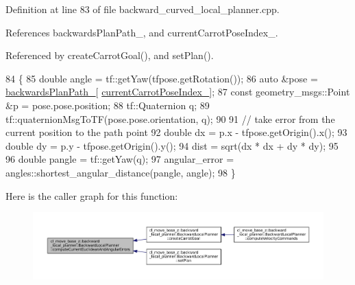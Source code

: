 Definition at line 83 of file backward\+\_\+curved\+\_\+local\+\_\+planner.\+cpp.



References backwards\+Plan\+Path\+\_\+, and current\+Carrot\+Pose\+Index\+\_\+.



Referenced by create\+Carrot\+Goal(), and set\+Plan().


\begin{DoxyCode}
84         \{
85             \textcolor{keywordtype}{double} angle = tf::getYaw(tfpose.getRotation());
86             \textcolor{keyword}{auto} &pose = \hyperlink{classcl__move__base__z_1_1backward__local__planner_1_1BackwardLocalPlanner_ad9cde5c85f782cab2ddb4030e3c3f2cf}{backwardsPlanPath\_}[
      \hyperlink{classcl__move__base__z_1_1backward__local__planner_1_1BackwardLocalPlanner_a2e8f2b78bc97f27c5fa431f3af2261ed}{currentCarrotPoseIndex\_}];
87             \textcolor{keyword}{const} geometry\_msgs::Point &p = pose.pose.position;
88             tf::Quaternion q;
89             tf::quaternionMsgToTF(pose.pose.orientation, q);
90 
91             \textcolor{comment}{// take error from the current position to the path point}
92             \textcolor{keywordtype}{double} dx = p.x - tfpose.getOrigin().x();
93             \textcolor{keywordtype}{double} dy = p.y - tfpose.getOrigin().y();
94             dist = sqrt(dx * dx + dy * dy);
95 
96             \textcolor{keywordtype}{double} pangle = tf::getYaw(q);
97             angular\_error = angles::shortest\_angular\_distance(pangle, angle);
98         \}
\end{DoxyCode}
Here is the caller graph for this function\+:
\nopagebreak
\begin{figure}[H]
\begin{center}
\leavevmode
\includegraphics[width=350pt]{classcl__move__base__z_1_1backward__local__planner_1_1BackwardLocalPlanner_a843f030138afe0a28cf11a729fa67383_icgraph}
\end{center}
\end{figure}
\mbox{\label{classcl__move__base__z_1_1backward__local__planner_1_1BackwardLocalPlanner_a0fe2ebd23fd79e8b574127e819ef0e14}} 
